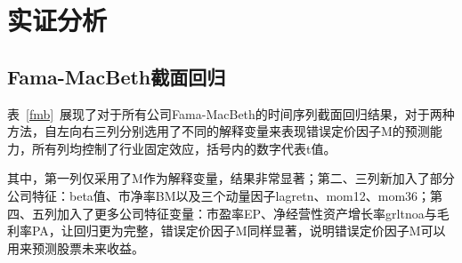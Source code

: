 
\chapter{实证分析}
\section{Fama-MacBeth截面回归}\label{sfmb}
表~\ref{fmb}~展现了对于所有公司Fama-MacBeth的时间序列截面回归结果，对于两种方法，自左向右三列分别选用了不同的解释变量来表现错误定价因子M的预测能力，所有列均控制了行业固定效应，括号内的数字代表t值。

其中，第一列仅采用了M作为解释变量，结果非常显著；第二、三列新加入了部分公司特征：beta值、市净率BM以及三个动量因子lagretn、mom12、mom36；第四、五列加入了更多公司特征变量：市盈率EP、净经营性资产增长率grltnoa与毛利率PA，让回归更为完整，错误定价因子M同样显著，说明错误定价因子M可以用来预测股票未来收益。

